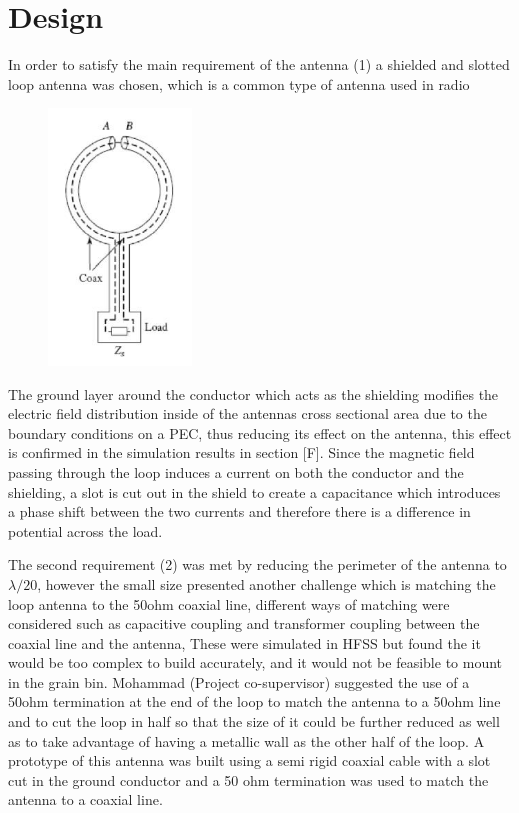 \section{Design}

In order to satisfy the main requirement of the antenna (1) a shielded and slotted loop antenna was chosen, which is a common type of antenna used in radio

\begin{figure}[h]
	\begin{center}
		\includegraphics[width=1.5in]{./images/Figure1.jpg}
		\caption{}
		\label{fig:hfield_fig1}
	\end{center}
\end{figure}

The ground layer around the conductor which acts as the shielding modifies the electric field distribution inside of the antennas cross sectional area due to the boundary conditions on a PEC, thus reducing its effect on the antenna, this effect is confirmed in the simulation results in section [F]. Since the magnetic field passing through the loop induces a current on both the conductor and the shielding, a slot is cut out in the shield to create a capacitance which introduces a phase shift between the two currents and therefore there is a difference in potential across the load.

The second requirement (2) was met by reducing the perimeter of the antenna to $\lambda/20$, however the small size presented another challenge which is matching the loop antenna to the 50ohm coaxial line, different ways of matching were considered such as capacitive coupling and transformer coupling between the coaxial line and the antenna, These were simulated in HFSS but found the it would be too complex to build accurately, and it would not be feasible to mount in the grain bin. Mohammad (Project co-supervisor) suggested the use of a 50ohm termination at the end of the loop to match the antenna to a 50ohm line and to cut the loop in half so that the size of it could be further reduced as well as to take advantage of having a metallic wall as the other half of the loop. A prototype of this antenna was built using a semi rigid coaxial cable with a slot cut in the ground conductor and a 50 ohm termination was used to match the antenna to a coaxial line.

